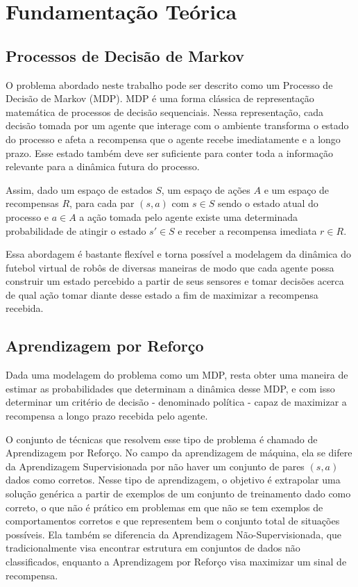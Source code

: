 \chapter{Fundamentação Teórica \label{chap:FundamentacaoMatematica}}



\section{Processos de Decisão de Markov}

O problema abordado neste trabalho pode ser descrito como um Processo de Decisão de Markov (MDP).
MDP é uma forma clássica de representação matemática de processos de decisão sequenciais.
Nessa representação, cada decisão tomada por um agente que interage com o ambiente transforma o estado do processo e afeta a recompensa que o agente recebe imediatamente e a longo prazo.
Esse estado também deve ser suficiente para conter toda a informação relevante para a dinâmica futura do processo.

Assim, dado um espaço de estados $S$, um espaço de ações $A$ e um espaço de recompensas $R$, para cada par $(s, a)$ com $s \in S$ sendo o estado atual do processo e $a \in A$ a ação tomada pelo agente existe uma determinada probabilidade de atingir o estado $s' \in S$ e receber a recompensa imediata $r \in R$\cite{sutton2018reinforcement}.

Essa abordagem é bastante flexível e torna possível a modelagem da dinâmica do futebol virtual de robôs de diversas maneiras de modo que cada agente possa construir um estado percebido a partir de seus sensores e tomar decisões acerca de qual ação tomar diante desse estado a fim de maximizar a recompensa recebida.

\section{Aprendizagem por Reforço}

Dada uma modelagem do problema como um MDP, resta obter uma maneira de estimar as probabilidades que determinam a dinâmica desse MDP, e com isso determinar um critério de decisão - denominado política - capaz de maximizar a recompensa a longo prazo recebida pelo agente.

O conjunto de técnicas que resolvem esse tipo de problema é chamado de Aprendizagem por Reforço.
No campo da aprendizagem de máquina, ela se difere da Aprendizagem Supervisionada por não haver um conjunto de pares $(s, a)$ dados como corretos.
Nesse tipo de aprendizagem, o objetivo é extrapolar uma solução genérica a partir de exemplos de um conjunto de treinamento dado como correto, o que não é prático em problemas em que não se tem exemplos de comportamentos corretos e que representem bem o conjunto total de situações possíveis.
Ela também se diferencia da Aprendizagem Não-Supervisionada, que tradicionalmente visa encontrar estrutura em conjuntos de dados não classificados, enquanto a Aprendizagem por Reforço visa maximizar um sinal de recompensa\cite{sutton2018reinforcement}.

